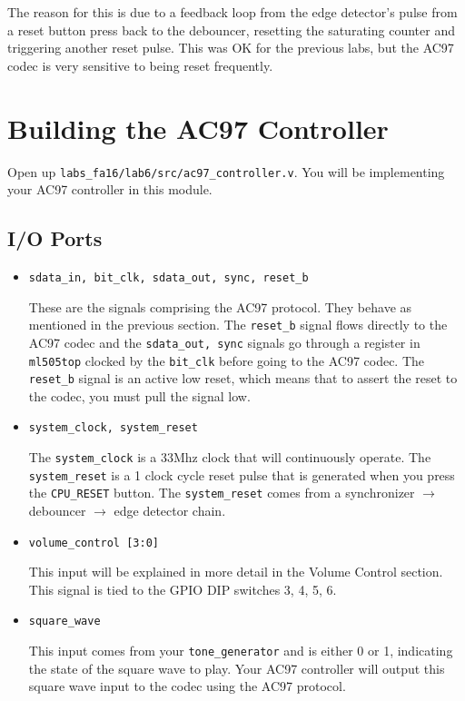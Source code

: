 \documentclass[11pt]{article}
\begin{document}
{\footnotesize The reason for this is due to a feedback loop from the edge detector's pulse from a reset button press back to the debouncer, resetting the saturating counter and triggering another reset pulse. This was OK for the previous labs, but the AC97 codec is very sensitive to being reset frequently.}

\section{Building the AC97 Controller}

Open up \verb|labs_fa16/lab6/src/ac97_controller.v|. You will be implementing your AC97 controller in this module.

\subsection{I/O Ports}
\begin{itemize}
	\item \verb|sdata_in, bit_clk, sdata_out, sync, reset_b| 
	
	These are the signals comprising the AC97 protocol. They behave as mentioned in the previous section. The \verb|reset_b| signal flows directly to the AC97 codec and the \verb|sdata_out, sync| signals go through a register in \verb|ml505top| clocked by the \verb|bit_clk| before going to the AC97 codec. The \verb|reset_b| signal is an active low reset, which means that to assert the reset to the codec, you must pull the signal low.
	
	\item \verb|system_clock, system_reset|
	
	The \verb|system_clock| is a 33Mhz clock that will continuously operate. The \verb|system_reset| is a 1 clock cycle reset pulse that is generated when you press the \verb|CPU_RESET| button. The \verb|system_reset| comes from a synchronizer $\rightarrow$ debouncer $\rightarrow$ edge detector chain.
	
	\item \verb|volume_control [3:0]|
	
	This input will be explained in more detail in the Volume Control section. This signal is tied to the GPIO DIP switches 3, 4, 5, 6.
	
	\item \verb|square_wave|
	
	This input comes from your \verb|tone_generator| and is either 0 or 1, indicating the state of the square wave to play. Your AC97 controller will output this square wave input to the codec using the AC97 protocol.
\end{itemize}
\end{document}
